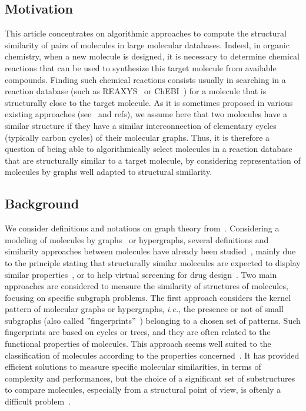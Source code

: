 \documentclass[10pt,letterpaper]{article}
\begin{document}
\subsection*{Motivation}
This article concentrates on algorithmic approaches to compute the structural similarity of pairs of molecules in large molecular databases. Indeed, in organic chemistry, when a new molecule is designed, it is necessary to determine chemical reactions that can be used to synthesize this target molecule from available compounds. Finding such chemical reactions consists usually in searching in a reaction database (such as REAXYS~\cite{reaxys} or ChEBI~\cite{chebi}) for a molecule that is structurally close to the target molecule. As it is sometimes proposed in various existing approaches (see~\cite{Birchall2011} and refs), we assume here that two molecules have a similar structure if they have a similar interconnection of elementary cycles (typically carbon cycles) of their molecular graphs. Thus, it is therefore a question of being able to algorithmically select molecules in a reaction database that are structurally similar to a target molecule, by considering representation of molecules by graphs well adapted to structural similarity.

\subsection*{Background}
We consider definitions and notations on graph theory from~\cite{Berge1963}. Considering a modeling of molecules by graphs~\cite{Gasteiger2003} or hypergraphs, several definitions and similarity approaches between molecules have already been studied~\cite{Raymond2002}, mainly due to the principle stating that structurally similar molecules are expected to display similar properties~\cite{Zager2008,Johnson1990}, or to help virtual screening for drug design~\cite{Eckert2007}. Two main approaches are considered to measure the similarity of structures of molecules, focusing on specific subgraph problems.
The first approach considers the kernel pattern of molecular graphs or hypergraphs, \textit{i.e.}, the presence or not of small subgraphs (also called ”fingerprints”~\cite{Cereto2015,Bender2009}) belonging to a chosen set of patterns. Such fingerprints are based on cycles or trees, and they are  often related to the functional properties of molecules. This approach seems well suited to the classification of molecules according to the properties concerned~\cite{Grave2010,Gauzere2015}. It has provided efficient solutions to measure specific molecular similarities, in terms of complexity and performances, but the choice of a significant set of substructures to compare molecules, especially from a structural point of view, is oftenly a difficult problem~\cite{Birchall2011,Flower1998,Raymond2002}.
\end{document}
